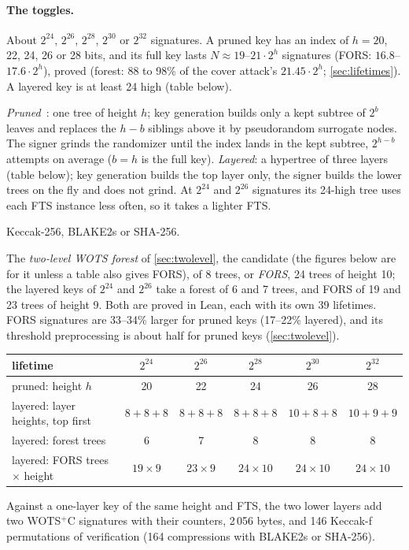 \documentclass[11pt]{article}
\begin{document}
\paragraph{The toggles.}
\begin{description}[leftmargin=1.2em]
  \item[T1, lifetime.] About $2^{24}$, $2^{26}$, $2^{28}$, $2^{30}$ or $2^{32}$ signatures. A pruned key has an index of
        $h=20$, 22, 24, 26 or 28 bits, and its full key lasts $N\approx19$--$21\cdot2^h$ signatures (FORS:
        $16.8$--$17.6\cdot2^h$), proved (forest: 88 to 98\% of the cover attack's $21.45\cdot2^h$;
        \cref{sec:lifetimes}). A layered key is at least 24 high (table below).
  \item[T2, shape.] \emph{Pruned}~\cite{conduition}: one tree of height $h$; key generation builds only a kept subtree
        of $2^b$ leaves and replaces the $h-b$ siblings above it by pseudorandom surrogate nodes. The signer grinds
        the randomizer until the index lands in the kept subtree, $2^{h-b}$ attempts on average ($b=h$ is the full
        key). \emph{Layered}: a hypertree of three layers (table below); key generation builds the top layer only,
        the signer builds the lower trees on the fly and does not grind. At $2^{24}$ and $2^{26}$ signatures its
        24-high tree uses each FTS instance less often, so it takes a lighter FTS.
  \item[T3, hash.] Keccak-256, BLAKE2s or SHA-256.
  \item[T4, FTS.] The \emph{two-level WOTS forest} of \cref{sec:twolevel}, the candidate (the figures below are
        for it unless a table also gives FORS), of 8 trees, or \emph{FORS}, 24 trees of height 10; the
        layered keys of $2^{24}$ and $2^{26}$ take a forest of 6 and 7 trees, and FORS of 19 and 23 trees of
        height 9. Both are proved in Lean, each with its own 39 lifetimes. FORS signatures are 33--34\% larger for
        pruned keys (17--22\% layered), and its threshold preprocessing is about half for pruned keys
        (\cref{sec:twolevel}).
\end{description}

\begin{center}
\begin{tabular}{lccccc}
  \toprule
  lifetime & $2^{24}$ & $2^{26}$ & $2^{28}$ & $2^{30}$ & $2^{32}$ \\
  \midrule
  pruned: height $h$ & 20 & 22 & 24 & 26 & 28 \\
  layered: layer heights, top first & $8+8+8$ & $8+8+8$ & $8+8+8$ & $10+8+8$ & $10+9+9$ \\
  layered: forest trees & 6 & 7 & 8 & 8 & 8 \\
  layered: FORS trees $\times$ height & $19\times9$ & $23\times9$ & $24\times10$ & $24\times10$ & $24\times10$ \\
  \bottomrule
\end{tabular}
\end{center}
Against a one-layer key of the same height and FTS, the two lower layers add two WOTS$^+$C signatures with their
counters, 2\,056 bytes, and 146 Keccak-f permutations
of verification (164 compressions with BLAKE2s or SHA-256).
\end{document}
